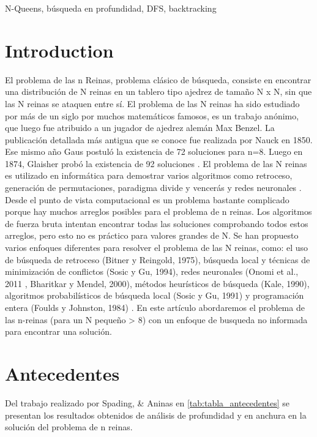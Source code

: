 \documentclass[conference]{IEEEtran}
\begin{document}
\begin{IEEEkeywords}

N-Queens, búsqueda en profundidad, DFS, backtracking
\end{IEEEkeywords}

\section{Introduction}
El problema de las n Reinas, problema clásico de búsqueda, consiste en encontrar una distribución de N reinas en un tablero tipo ajedrez de tamaño N x N, sin que las N reinas se ataquen entre sí.
El problema de las N reinas ha sido estudiado por más de un siglo por muchos matemáticos famosos, es un trabajo anónimo, que luego fue atribuido a un jugador de ajedrez alemán Max Benzel. La publicación detallada más antigua que se conoce fue realizada por Nauck en 1850. Ese mismo año Gaus postuló la existencia de 72 soluciones para n=8. Luego en 1874, Glaisher probó la existencia de 92 soluciones \cite{r1}.
El problema de las N reinas es utilizado en informática para demostrar varios algoritmos como retroceso, generación de permutaciones, paradigma divide y vencerás y redes neuronales \cite{r5_set_backtrack}.
Desde el punto de vista computacional es un problema bastante complicado porque hay muchos arreglos posibles para el problema de n reinas. Los algoritmos de fuerza bruta intentan encontrar todas las soluciones comprobando todos estos arreglos, pero esto no es práctico para valores grandes de N. Se han propuesto varios enfoques diferentes para resolver el problema de las N reinas, como: el uso de búsqueda de retroceso (Bitner y Reingold, 1975), búsqueda local y técnicas de minimización de conflictos (Sosic y Gu, 1994), redes neuronales (Onomi et al., 2011 , Bharitkar y Mendel, 2000), métodos heurísticos de búsqueda (Kale, 1990), algoritmos probabilísticos de búsqueda local (Sosic y Gu, 1991) y programación entera (Foulds y Johnston, 1984) \cite{r7_parallel}.
En este artículo abordaremos el problema de las n-reinas (para un N pequeño > 8) con un enfoque de busqueda no informada para encontrar una solución.

\section{Antecedentes}
Del trabajo realizado por Spading, \& Aninas \cite{r3_bfs_dfs} en \autoref{tab:tabla_antecedentes} se presentan los resultados obtenidos de análisis de profundidad y en anchura en la solución del problema de n reinas.
\end{document}
